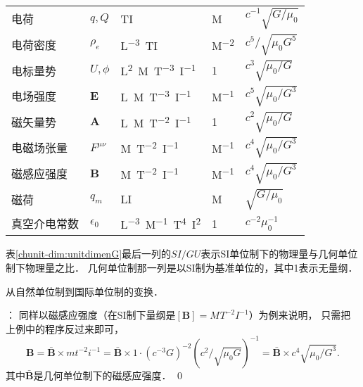 \begin{longtable}{|*5{l|}}
    电荷 & $q,Q$     &   \si{TI}        &  \si{M} & $c^{-1} \sqrt{G/\mu_0}$ \\
    电荷密度 & $\rho_e$     &   \si{L^{-3}TI}      &   \si{M^{-2}} & $c^{5} /\sqrt{\mu_0 G^5}$ \\
    电标量势 & $U,\phi$  &   \si{L^{2}M^{}T^{-3}I^{-1}}       &   \si{1}& $c^{3} \sqrt{\mu_0 /G}$ \\
    电场强度 &  $\boldsymbol{E}$   &   \si{L^{}M^{}T^{-3}I^{-1}}    &  \si{M^{-1}} & $c^{5} \sqrt{\mu_0 /G^3}$  \\
    磁矢量势 & $\boldsymbol{A}$     &   \si{L^{}M^{}T^{-2}I^{-1}}      &  \si{1} &  $c^{2} \sqrt{\mu_0 /G}$ \\
    电磁场张量 & $F^{\mu\nu}$ &   \si{M^{}T^{-2}I^{-1}}      &  \si{M^{-1}} & $c^{4} \sqrt{\mu_0 /G^3}$  \\
    磁感应强度 & $\boldsymbol{B}$     &   \si{M^{}T^{-2}I^{-1}}      &  \si{M^{-1}} & $c^{4} \sqrt{\mu_0 /G^3}$  \\
    磁荷 & $q_m$     &   \si{LI}      &   \si{M}&   $\sqrt{ G/ \mu_0}$ \\
    真空介电常数 & $\epsilon_0$    &   \si{L^{-3}M^{-1}T^{4}I^{2}} &  \si{1}  & $c^{-2} \mu_0^{-1}$\\
    \hline
\end{longtable}
表\ref{chunit-dim:unitdimenG}最后一列的$SI/GU$表示SI单位制下的物理量与几何单位制下物理量之比．
几何单位制那一列是以SI制为基准单位的，其中\si{1}表示无量纲．


\begin{example}
    从自然单位制到国际单位制的变换．
\end{example}
：
同样以磁感应强度（在SI制下量纲是$[\boldsymbol{B}]=\si{M^{}T^{-2}I^{-1}} $）为例来说明，
只需把上例中的程序反过来即可，
\begin{equation*}
    \boldsymbol{B} = \bar{\boldsymbol{B}} \times {m t^{-2} i^{-1}}
    = \bar{\boldsymbol{B}} \times
    {1\cdot (c^{-3}G)^{-2} (c^2 /\sqrt{\mu_0 G})^{-1}}
    =\bar{\boldsymbol{B}} \times  {c^{4} \sqrt{\mu_0/G^{3}}} .
\end{equation*}
其中$\bar{\boldsymbol{B}}$是几何单位制下的磁感应强度．
\qed


